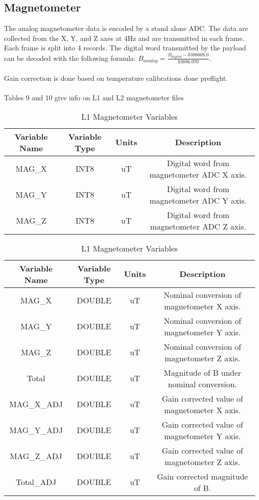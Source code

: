 \documentclass{article}
\begin{document}
\subsection{Magnetometer}
The analog magnetometer data is encoded by a stand alone ADC. The data are collected from the X, Y, and Z axes at 4Hz and are transmitted in each frame. Each frame is split into 4 records. The digital word transmitted by the payload can be decoded with the following formula: $B_{analog} = \frac{B_{digital} - 8388608.0}{83886.070}$.\\\\
Gain correction is done based on temperature calibrations done preflight.\\\\
Tables 9 and 10 give info on L1 and L2 magnetometer files

\begin{table}[H]
\caption{L1 Magnetometer Variables}
\begin{tabular}{|c|c|c|c|}
\hline
Variable Name&Variable Type&Units&Description\\ \hline
MAG\_X&INT8&uT&Digital word from magnetometer ADC X axis.\\ 
MAG\_Y&INT8&uT&Digital word from magnetometer ADC Y axis.\\ 
MAG\_Z&INT8&uT&Digital word from magnetometer ADC Z axis.\\ 
\hline
\end{tabular}
\end{table}

\begin{table}[H]
\caption{L1 Magnetometer Variables}
\begin{tabular}{|c|c|c|c|}
\hline
Variable Name&Variable Type&Units&Description\\ \hline
MAG\_X&DOUBLE&uT&Nominal conversion of magnetometer X axis.\\ 
MAG\_Y&DOUBLE&uT&Nominal conversion of magnetometer Y axis.\\ 
MAG\_Z&DOUBLE&uT&Nominal conversion of magnetometer Z axis.\\ 
Total&DOUBLE&uT&Magnitude of B under nominal conversion.\\ 
MAG\_X\_ADJ&DOUBLE&uT&Gain corrected value of magnetometer X axis.\\ 
MAG\_Y\_ADJ&DOUBLE&uT&Gain corrected value of magnetometer Y axis.\\ 
MAG\_Z\_ADJ&DOUBLE&uT&Gain corrected value of magnetometer Z axis.\\ 
Total\_ADJ&DOUBLE&uT&Gain corrected magnitude of B.\\ 
\hline
\end{tabular}
\end{table}
\end{document}
